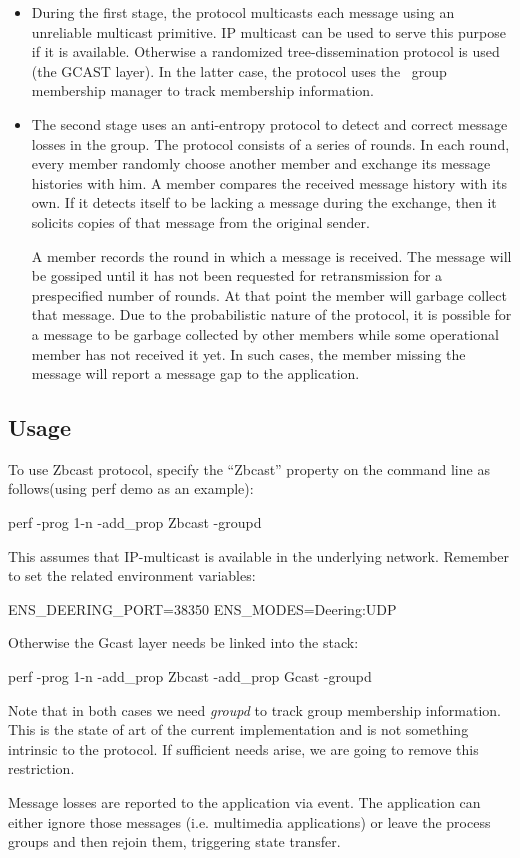 \begin{itemize}
 \item During the first stage, the protocol multicasts each message
 using an unreliable multicast primitive.  IP multicast can be used to
 serve this purpose if it is available.  Otherwise a randomized
 tree-dissemination protocol is used (the GCAST layer).  In the latter
 case, the protocol uses the \ensemble\ group membership manager to
 track membership information.

 \item The second stage uses an anti-entropy protocol to detect and
 correct message losses in the group.  The protocol consists of a
 series of rounds.  In each round, every member randomly choose
 another member and exchange its message histories with him.  A member
 compares the received message history with its own.  If it detects
 itself to be lacking a message during the exchange, then it solicits
 copies of that message from the original sender.

 A member records the round in which a message is received.  The
 message will be gossiped until it has not been requested for
 retransmission for a prespecified number of rounds.  At that point
 the member will garbage collect that message.  Due to the
 probabilistic nature of the protocol, it is possible for a message to
 be garbage collected by other members while some operational member
 has not received it yet.  In such cases, the member missing the
 message will report a message gap to the application.
 
\end{itemize}


\subsection{Usage}

To use Zbcast protocol, specify the ``Zbcast'' property on the command
line as follows(using perf demo as an example):
\begin{codebox}
  perf -prog 1-n -add_prop Zbcast -groupd
\end{codebox}
This assumes that IP-multicast is available in the underlying
network.  Remember to set the related environment variables:
\begin{codebox}
ENS_DEERING_PORT=38350
ENS_MODES=Deering:UDP
\end{codebox}

Otherwise the Gcast layer needs be linked into the stack:
\begin{codebox}
  perf -prog 1-n -add_prop Zbcast -add_prop Gcast -groupd
\end{codebox}
Note that in both cases we need \emph{groupd} to track group
membership information.  This is the state of art of the current
implementation and is not something intrinsic to the protocol.  If
sufficient needs arise, we are going to remove this restriction.

Message losses are reported to the application via 
event.  The application can either ignore those messages
(i.e. multimedia applications) or leave the process groups and then
rejoin them, triggering state transfer.
